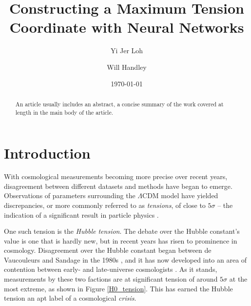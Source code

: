 \documentclass[%
 reprint,
 amsmath,amssymb,
 aps,
]{revtex4-2}
\begin{document}

\title{Constructing a Maximum Tension Coordinate with Neural Networks}

\author{Yi Jer Loh}
\author{Will Handley}
%

\date{\today}

\begin{abstract}
An article usually includes an abstract, a concise summary of the work
covered at length in the main body of the article. 
\end{abstract}

\maketitle



\section{\label{sec:level1}Introduction}

With cosmological measurements becoming more precise over recent years, disagreement between different datasets and methods have began to emerge. Observations of parameters surrounding the $\Lambda \textrm{CDM}$ model have yielded discrepancies, or more commonly referred to as \textit{tensions}, of close to $5\sigma$ -- the indication of a significant result in particle physics \cite{Franklin2013}. 

One such tension is the \textit{Hubble tension}. The debate over the Hubble constant's value is one that is hardly new, but in recent years has risen to prominence in cosmology. Disagreement over the Hubble constant began between de Vaucouleurs and Sandage in the 1980s \cite{deVaucouleurs1986, Sandage1975}, and it has now developed into an area of contention between early- and late-universe cosmologists \cite{Planck2020, Abbott2018, Freedman2020, Riess2019, Wong2019}. As it stands, measurements by these two factions are at significant tension of around $5\sigma$ at the most extreme, as shown in Figure \ref{H0_tension}. This has earned the Hubble tension an apt label of a cosmological \textit{crisis}.
\end{document}
